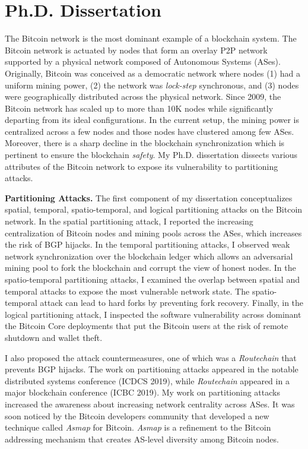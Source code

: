 \documentclass{NSF}
\newcommand{\BfPara}[1]{{\noindent\textbf{#1.}}\xspace}
\begin{document}
\section{Ph.D. Dissertation}
The Bitcoin network is the most dominant example of a blockchain system. The Bitcoin network is actuated by nodes that form an overlay P2P network supported by a physical network composed of Autonomous Systems (ASes). Originally, Bitcoin was conceived as a democratic network where nodes (1) had a uniform mining power, (2) the network was {\em lock-step} synchronous, and (3) nodes were geographically distributed across the physical network. Since 2009, the Bitcoin network has scaled up to more than 10K nodes while significantly departing from its ideal configurations. In the current setup, the mining power is centralized across a few nodes and those nodes have clustered among few ASes. Moreover, there is a sharp decline in the blockchain synchronization which is pertinent to ensure the blockchain {\em safety}. My Ph.D. dissertation dissects various attributes of the Bitcoin network to expose its vulnerability to partitioning attacks.





\BfPara{Partitioning Attacks} The first component of my dissertation conceptualizes spatial, temporal, spatio-temporal, and logical partitioning attacks on the Bitcoin network. In the spatial partitioning attack, I reported the increasing centralization of Bitcoin nodes and mining pools across the ASes, which increases the risk of BGP hijacks. In the temporal partitioning attacks, I observed weak network synchronization over the blockchain ledger which allows an adversarial mining pool to fork the blockchain and corrupt the view of honest nodes. In the spatio-temporal partitioning attacks, I examined the overlap between spatial and temporal attacks to expose the most vulnerable network state. The spatio-temporal attack can lead to hard forks by preventing fork recovery.  Finally, in the logical partitioning attack, I inspected the software vulnerability across dominant the Bitcoin Core deployments that put the Bitcoin users at the risk of remote shutdown and wallet theft. 

I also proposed the attack countermeasures, one of which was a {\em Routechain} that prevents BGP hijacks. The work on partitioning attacks appeared in the notable distributed systems conference (ICDCS 2019), while {\em Routechain} appeared in a major blockchain conference (ICBC 2019). My work on partitioning attacks increased the awareness about increasing network centrality across ASes. It was soon noticed by the Bitcoin developers community that developed a new technique called {\em Asmap} for Bitcoin. {\em Asmap} is a refinement to the Bitcoin addressing mechanism that creates AS-level diversity among Bitcoin nodes. 
\end{document}
